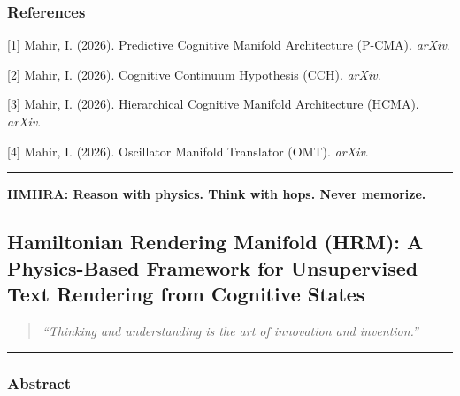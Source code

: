 \documentclass[
  11pt,
  a4paper,
]{article}
\begin{document}
\subsubsection{References}\label{references-4}

{[}1{]} Mahir, I. (2026). Predictive Cognitive Manifold Architecture
(P-CMA). \emph{arXiv}.

{[}2{]} Mahir, I. (2026). Cognitive Continuum Hypothesis (CCH).
\emph{arXiv}.

{[}3{]} Mahir, I. (2026). Hierarchical Cognitive Manifold Architecture
(HCMA). \emph{arXiv}.

{[}4{]} Mahir, I. (2026). Oscillator Manifold Translator (OMT).
\emph{arXiv}.

\begin{center}\rule{0.5\linewidth}{0.5pt}\end{center}

\textbf{HMHRA: Reason with physics. Think with hops. Never memorize.}

\newpage

\subsection{Hamiltonian Rendering Manifold (HRM): A Physics-Based
Framework for Unsupervised Text Rendering from Cognitive
States}\label{hamiltonian-rendering-manifold-hrm-a-physics-based-framework-for-unsupervised-text-rendering-from-cognitive-states}

\begin{quote}
\emph{``Thinking and understanding is the art of innovation and
invention.''}
\end{quote}

\begin{center}\rule{0.5\linewidth}{0.5pt}\end{center}

\subsubsection{Abstract}\label{abstract-5}
\end{document}
